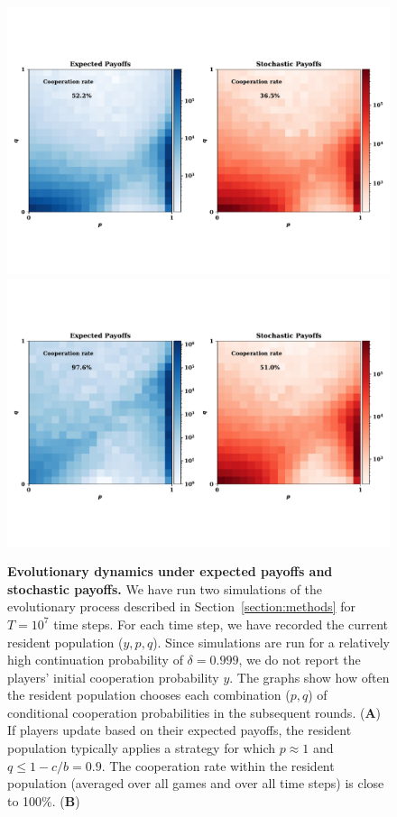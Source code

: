 \documentclass[11pt]{article}
\theoremstyle{plainCl1}
\theoremstyle{plainCl2}
\begin{document}
\begin{figure}[!htbp]
    \centering
    \includegraphics[width=.75\textwidth]{static/expected_and_stochastic_for_donation_game.pdf}\vspace{-3cm}
    \includegraphics[width=.75\textwidth]{static/expected_and_stochastic_for_donation_game_b_10.pdf}
    \caption{{\bf Evolutionary dynamics under expected payoffs and stochastic payoffs.} 
    We have run two simulations of the evolutionary process described in
    Section~\ref{section:methods} for $T\!=\!10^7$ time steps. For each time step,
    we have recorded the current resident population ($y,p,q$). Since simulations
    are run for a relatively high continuation probability of $\delta\!=\!0.999$, we
    do not report the players' initial cooperation probability $y$. The graphs show
    how often the resident population chooses each combination ($p,q$) of
    conditional cooperation probabilities in the subsequent rounds. ({\bf A}) If
    players update based on their expected payoffs, the resident population
    typically applies a strategy for which $p\!\approx\!1$ and
    $q\!\le\!1\!-\!c/b\!=\!0.9$. The cooperation rate within the resident population
    (averaged over all games and over all time steps) is close to 100\%. ({\bf B})
}
\end{figure}
\end{document}
